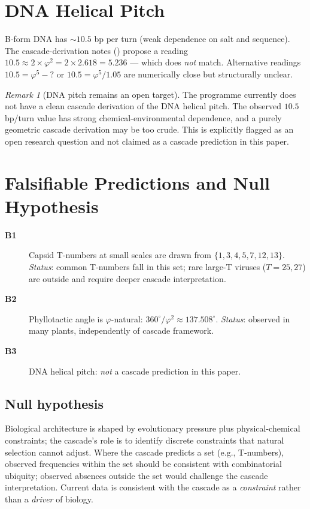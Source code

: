 \documentclass[12pt]{article}
\theoremstyle{definition}
\theoremstyle{remark}
\newtheorem{remark}[theorem]{Remark}
\begin{document}
\section{DNA Helical Pitch}\label{sec:dna}

B-form DNA has $\sim 10.5$ bp per turn (weak dependence on salt and sequence). The cascade-derivation notes (\citep{CascadeBioDNA}) propose a reading $10.5 \approx 2 \times \varphi^2 = 2 \times 2.618 = 5.236$ --- which does \emph{not} match. Alternative readings $10.5 = \varphi^5 - ?$ or $10.5 = \varphi^5 / 1.05$ are numerically close but structurally unclear.

\begin{remark}[DNA pitch remains an open target]
The programme currently does not have a clean cascade derivation of the DNA helical pitch. The observed $10.5$ bp/turn value has strong chemical-environmental dependence, and a purely geometric cascade derivation may be too crude. This is explicitly flagged as an open research question and not claimed as a cascade prediction in this paper.
\end{remark}

\section{Falsifiable Predictions and Null Hypothesis}\label{sec:predictions}

\begin{description}
\item[\textbf{B1}] Capsid T-numbers at small scales are drawn from $\{1, 3, 4, 5, 7, 12, 13\}$. \emph{Status}: common T-numbers fall in this set; rare large-T viruses ($T = 25, 27$) are outside and require deeper cascade interpretation.
\item[\textbf{B2}] Phyllotactic angle is $\varphi$-natural: $360^\circ / \varphi^2 \approx 137.508^\circ$. \emph{Status}: observed in many plants, independently of cascade framework.
\item[\textbf{B3}] DNA helical pitch: \emph{not} a cascade prediction in this paper.
\end{description}

\subsection{Null hypothesis}
Biological architecture is shaped by evolutionary pressure plus physical-chemical constraints; the cascade's role is to identify discrete constraints that natural selection cannot adjust. Where the cascade predicts a set (e.g., T-numbers), observed frequencies within the set should be consistent with combinatorial ubiquity; observed absences outside the set would challenge the cascade interpretation. Current data is consistent with the cascade as a \emph{constraint} rather than a \emph{driver} of biology.
\end{document}
